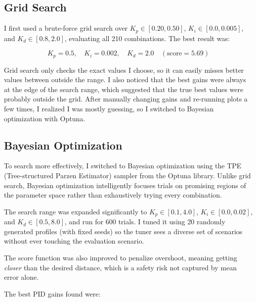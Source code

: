 \documentclass{article}
\begin{document}
\subsection*{Grid Search}

I first used a brute-force grid search over $K_p \in [0.20, 0.50]$, $K_i \in [0.0, 0.005]$, and $K_d \in [0.8, 2.0]$, evaluating all 210 combinations. The best result was:

\[
K_p = 0.5, \quad K_i = 0.002, \quad K_d = 2.0 \quad (\text{score} = 5.69)
\]

 Grid search only checks the exact values I choose, so it can easily misses better values between outside the range. I also noticed that the best gains were always at the edge of the search range, which suggested that the true best values were probably outside the grid. After manually changing gains and re-running plots a few times, I realized I was mostly guessing, so I switched to Bayesian optimization with Optuna.

\subsection*{Bayesian Optimization}

To search more effectively, I switched to Bayesian optimization using the TPE (Tree-structured Parzen Estimator) sampler from the Optuna library. Unlike grid search, Bayesian optimization intelligently focuses trials on promising regions of the parameter space rather than exhaustively trying every combination.

The search range was expanded significantly to $K_p \in [0.1, 4.0]$, $K_i \in [0.0, 0.02]$, and $K_d \in [0.5, 8.0]$, and run for 600 trials. I tuned it  using 20 randomly generated profiles (with fixed seeds) so the tuner sees a diverse set of scenarios without ever touching the evaluation scenario.

The score function was also improved to penalize overshoot, meaning getting \emph{closer} than the desired distance, which is a safety risk not captured by mean error alone.

The best PID gains found were:
\end{document}
